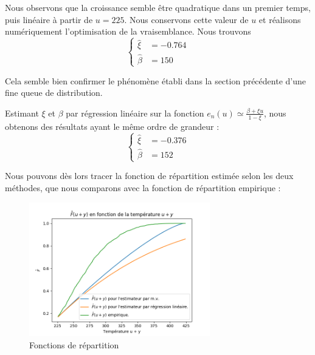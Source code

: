 \documentclass[../report.tex]{subfiles}
\begin{document}
\par Nous observons que la croissance semble être quadratique dans un premier temps, puis linéaire à partir de $u = 225$. Nous conservons cette valeur de $u$ et réalisons numériquement l'optimisation de la vraisemblance. Nous trouvons 
\begin{displaymath}
\begin{cases}
\hat{\xi} &= -0.764\\
\hat{\beta} &= 150
\end{cases}
\end{displaymath}

\par Cela semble bien confirmer le phénomène établi dans la section précédente d'une fine queue de distribution.

\par Estimant $\xi$ et $\beta$ par régression linéaire sur la fonction $e_n \left( u \right) \simeq \frac{\beta + \xi u}{1 - \xi}$, nous obtenons des résultats ayant le même ordre de grandeur : 
\begin{displaymath}
\begin{cases}
\hat{\xi} &= -0.376\\
\hat{\beta} &= 152
\end{cases}
\end{displaymath}

\par Nous pouvons dès lors tracer la fonction de répartition estimée selon les deux méthodes, que nous comparons avec la fonction de répartition empirique :
\begin{figure}[H]
  \centering
    \includegraphics[width=0.7\textwidth]{images/part_2/repartition.png}
  \caption{Fonctions de répartition}
\end{figure}
\end{document}
